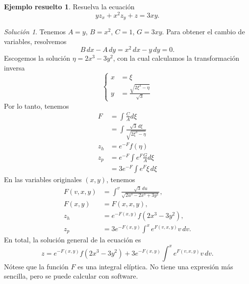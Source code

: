 \documentclass[11pt,letterpaper,draft]{report}
\theoremstyle{plain}
\theoremstyle{definition}
\newtheorem{solved}[theorem]{Ejemplo resuelto}
\theoremstyle{remark}
\newtheorem*{solution}{Solución}
\newcommand\<{\langle}
\renewcommand\>{\rangle}
\begin{document}
\begin{solved}
  Resuelva la ecuación
  \begin{equation}
    yz_x + x^{2}z_y + z = 3xy
  .\end{equation}
  \begin{solution}
    Tenemos \(A=y\), \(B=x^{2}\), \(C=1\), \(G=3xy\).
    Para obtener el cambio de variables, resolvemos
    \begin{equation}
      B\,dx - A\,dy = x^{2}\,dx - y\,dy = 0
    .\end{equation}
    Escogemos la solución \(\eta=2x^{3} - 3y^{2}\), con la cual
    calculamos la transformación inversa
    \begin{equation}
      \left\{
        \begin{aligned}
          x &= \xi
          \\
          y &= \frac{\sqrt{2\xi^{3}-\eta}}{\sqrt 3}
        \end{aligned}
      \right.
    \end{equation}
    Por lo tanto, tenemos
    \begin{align}
      F
      &= \int \tfrac{C}{A}d\xi \\
      &= \int \frac{\sqrt{3}\,d\xi}{\sqrt{2\xi^{3}-\eta}}
      \\
      z_h
      &= e^{-F}f(\eta)
      \\
      z_p
      &= e^{-F}\int e^{F}\tfrac{G}{A}d\xi \\
      &= 3e^{-F}\int e^{F}\xi\,d\xi
    \end{align}
    En las variables originales \((x,y)\), tenemos
    \begin{align}
      F(v,x,y)
      &= \int^v \frac{\sqrt{3}\,du}{\sqrt{2u^{3}-2x^{3}+3y^{2}}},
      \\
      F(x,y) &= F(x,x,y), \\
      z_h &= e^{-F(x,y)}f(2x^{3} - 3y^{2}), \\
      z_p
      &= 3e^{-F(x,y)}\int^x e^{F(v,x,y)}v\,dv.
    \end{align}
    En total, la solución general de la ecuación es
    \begin{equation}
      z
      =
      e^{-F(x,y)}f(2x^{3} - 3y^{2})
      +
      3e^{-F(x,y)}\int^x
      e^{F(v,x,y)} v\,dv
    .\end{equation}
    Nótese que la función \(F\) es una integral elíptica.
    No tiene una expresión más sencilla, pero se puede calcular
    con software.
  \end{solution}
\end{solved}
\end{document}
